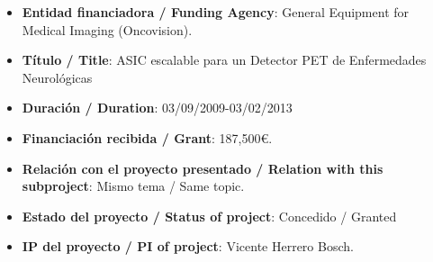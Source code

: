 \begin{enumerate}
\begin{itemize}
\item {\bf Entidad financiadora / Funding Agency}: General Equipment for Medical Imaging (Oncovision).
\item {\bf Título / Title}:  ASIC escalable para un Detector PET de Enfermedades Neurológicas
\item {\bf Duraci\'on / Duration}: 03/09/2009-03/02/2013
\item {\bf Financiación recibida / Grant}: 187,500\euro. 
\item {\bf Relación con el proyecto presentado / Relation with this subproject}: Mismo tema / Same topic. 
\item {\bf Estado del proyecto / Status of project}: Concedido / Granted
\item {\bf IP del proyecto / PI of project}: Vicente Herrero Bosch.
\end{itemize}
\end{enumerate}

